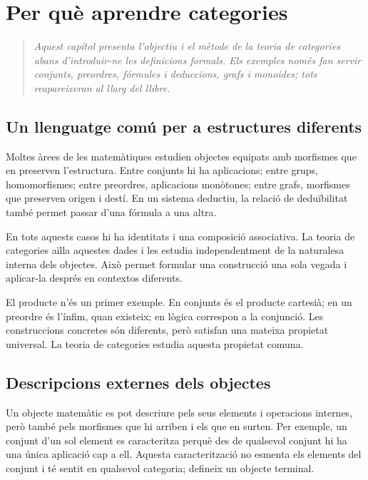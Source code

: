 \chapter*{Per què aprendre categories}

\begingroup
\renewcommand{\thesection}{\arabic{section}}
\setcounter{section}{0}

\begin{quote}
\itshape
Aquest capítol presenta l'objectiu i el mètode de la teoria de categories abans d'introduir-ne les definicions formals. Els exemples només fan servir conjunts, preordres, fórmules i deduccions, grafs i monoides; tots reapareixeran al llarg del llibre.
\end{quote}

\section{Un llenguatge comú per a estructures diferents}

Moltes àrees de les matemàtiques estudien objectes equipats amb morfismes que en preserven l'estructura. Entre conjunts hi ha aplicacions; entre grups, homomorfismes; entre preordres, aplicacions monòtones; entre grafs, morfismes que preserven origen i destí. En un sistema deductiu, la relació de deduïbilitat també permet passar d'una fórmula a una altra.

En tots aquests casos hi ha identitats i una composició associativa. La teoria de categories aïlla aquestes dades i les estudia independentment de la naturalesa interna dels objectes. Això permet formular una construcció una sola vegada i aplicar-la després en contextos diferents.

El producte n'és un primer exemple. En conjunts és el producte cartesià; en un preordre és l'ínfim, quan existeix; en lògica correspon a la conjunció. Les construccions concretes són diferents, però satisfan una mateixa propietat universal. La teoria de categories estudia aquesta propietat comuna.

\section{Descripcions externes dels objectes}

Un objecte matemàtic es pot descriure pels seus elements i operacions internes, però també pels morfismes que hi arriben i els que en surten. Per exemple, un conjunt d'un sol element es caracteritza perquè des de qualsevol conjunt hi ha una única aplicació cap a ell. Aquesta caracterització no esmenta els elements del conjunt i té sentit en qualsevol categoria; defineix un objecte terminal.

